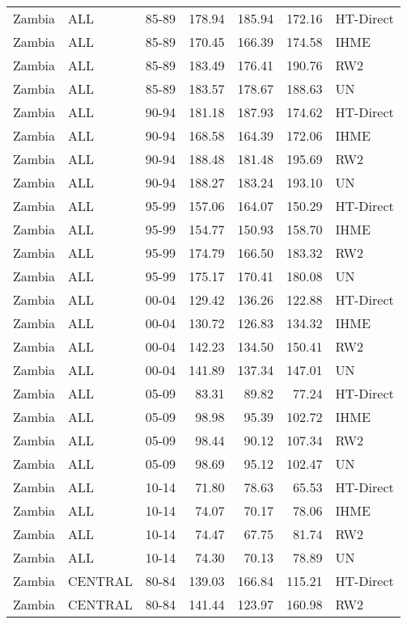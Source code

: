 \begin{longtable}{lllrrrl}
  Zambia & ALL & 85-89 & 178.94 & 185.94 & 172.16 & HT-Direct \\ 
  Zambia & ALL & 85-89 & 170.45 & 166.39 & 174.58 & IHME \\ 
  Zambia & ALL & 85-89 & 183.49 & 176.41 & 190.76 & RW2 \\ 
  Zambia & ALL & 85-89 & 183.57 & 178.67 & 188.63 & UN \\ 
  Zambia & ALL & 90-94 & 181.18 & 187.93 & 174.62 & HT-Direct \\ 
  Zambia & ALL & 90-94 & 168.58 & 164.39 & 172.06 & IHME \\ 
  Zambia & ALL & 90-94 & 188.48 & 181.48 & 195.69 & RW2 \\ 
  Zambia & ALL & 90-94 & 188.27 & 183.24 & 193.10 & UN \\ 
  Zambia & ALL & 95-99 & 157.06 & 164.07 & 150.29 & HT-Direct \\ 
  Zambia & ALL & 95-99 & 154.77 & 150.93 & 158.70 & IHME \\ 
  Zambia & ALL & 95-99 & 174.79 & 166.50 & 183.32 & RW2 \\ 
  Zambia & ALL & 95-99 & 175.17 & 170.41 & 180.08 & UN \\ 
  Zambia & ALL & 00-04 & 129.42 & 136.26 & 122.88 & HT-Direct \\ 
  Zambia & ALL & 00-04 & 130.72 & 126.83 & 134.32 & IHME \\ 
  Zambia & ALL & 00-04 & 142.23 & 134.50 & 150.41 & RW2 \\ 
  Zambia & ALL & 00-04 & 141.89 & 137.34 & 147.01 & UN \\ 
  Zambia & ALL & 05-09 & 83.31 & 89.82 & 77.24 & HT-Direct \\ 
  Zambia & ALL & 05-09 & 98.98 & 95.39 & 102.72 & IHME \\ 
  Zambia & ALL & 05-09 & 98.44 & 90.12 & 107.34 & RW2 \\ 
  Zambia & ALL & 05-09 & 98.69 & 95.12 & 102.47 & UN \\ 
  Zambia & ALL & 10-14 & 71.80 & 78.63 & 65.53 & HT-Direct \\ 
  Zambia & ALL & 10-14 & 74.07 & 70.17 & 78.06 & IHME \\ 
  Zambia & ALL & 10-14 & 74.47 & 67.75 & 81.74 & RW2 \\ 
  Zambia & ALL & 10-14 & 74.30 & 70.13 & 78.89 & UN \\ 
  Zambia & CENTRAL & 80-84 & 139.03 & 166.84 & 115.21 & HT-Direct \\ 
  Zambia & CENTRAL & 80-84 & 141.44 & 123.97 & 160.98 & RW2 \\ 

\end{longtable}
